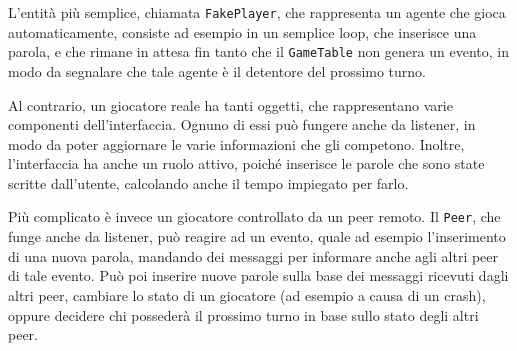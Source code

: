 \documentclass[10.5pt]{article}
\begin{document}
L'entità più semplice, chiamata \texttt{FakePlayer}, che rappresenta un agente che gioca automaticamente, consiste ad esempio in un semplice loop, che inserisce una parola, e che rimane in attesa fin tanto che il \texttt{GameTable} non genera un evento, in modo da segnalare che tale agente è il detentore del prossimo turno. 

Al contrario, un giocatore reale ha tanti oggetti, che rappresentano varie componenti dell'interfaccia. Ognuno di essi può fungere anche da listener, in modo da poter aggiornare le varie informazioni che gli competono. Inoltre, l'interfaccia ha anche un ruolo attivo, poiché inserisce le parole che sono state scritte dall'utente, calcolando anche il tempo impiegato per farlo.

Più complicato è invece un giocatore controllato da un peer remoto. Il \texttt{Peer}, che funge anche da listener, può reagire ad un evento, quale ad esempio l'inserimento di una nuova parola, mandando dei messaggi per informare anche agli altri peer di tale evento. Può poi inserire nuove parole sulla base dei messaggi ricevuti dagli altri peer, cambiare lo stato di un giocatore (ad esempio a causa di un crash), oppure decidere chi possederà il prossimo turno in base sullo stato degli altri peer.
\end{document}
